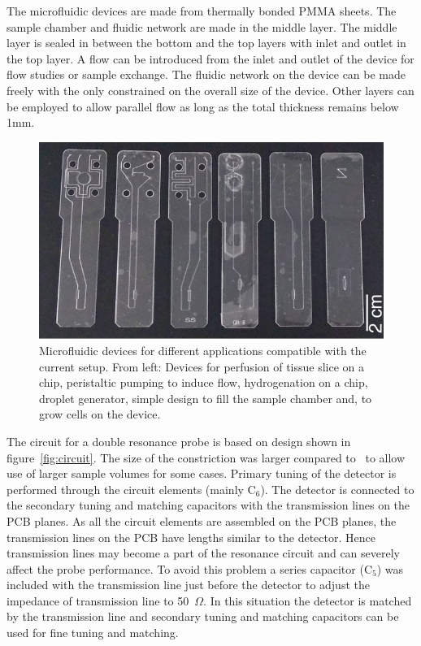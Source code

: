 \documentclass[preprint,12pt]{article}
\begin{document}
The microfluidic devices are made from thermally bonded PMMA sheets. The sample chamber and fluidic network are made in the middle layer. The middle layer is sealed in between the bottom and the top layers with inlet and outlet in the top layer. A flow can be introduced from the inlet and outlet of the device for flow studies or sample exchange. The fluidic network on the device can be made freely with the only constrained on the overall size of the device. Other layers can be employed to allow parallel flow as long as the total thickness remains below 1mm.\par
\begin{figure}
\centering
\includegraphics[width=.7\linewidth,keepaspectratio=true]{./figures/ms5n17-tlp-im-181007-devices.png} 
\caption{Microfluidic devices for different applications compatible with the current setup. From left: Devices for perfusion of tissue slice on a chip, peristaltic pumping to induce flow, hydrogenation on a chip, droplet generator, simple design to fill the sample chamber and, to grow cells on the device.}
\label{fig:device} 
\end{figure}
The circuit for a double resonance probe is based on design shown in figure~\ref{fig:circuit}. The size of the constriction was larger compared to~\cite{gream_2016} to allow use of larger sample volumes for some cases. Primary tuning of the detector is performed through the circuit elements (mainly C$_6$). The detector is connected to the secondary tuning and matching capacitors with the transmission lines on the PCB planes. As all the circuit elements are assembled on the PCB planes, the transmission lines on the PCB have lengths similar to the detector. Hence transmission lines may become a part of the resonance circuit and can severely affect the probe performance. To avoid this problem a series capacitor (C$_5$) was included with the transmission line just before the detector to adjust the impedance of transmission line to 50~$\Omega$. In this situation the detector is matched by the transmission line and secondary tuning and matching capacitors can be used for fine tuning and matching.\par
\end{document}
